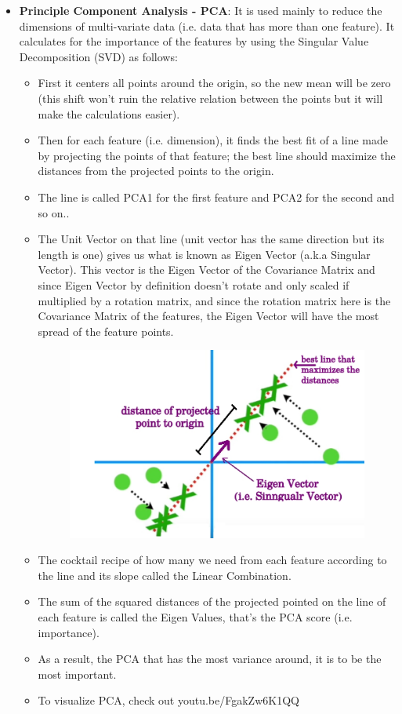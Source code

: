 \documentclass[11pt, twocolumn]{article}
\begin{document}
\begin{itemize}
\item \textbf{Principle Component Analysis - PCA}:
It is used mainly to reduce the dimensions of multi-variate data (i.e. data that has more than one feature). It calculates for the importance of the features by using the {\color{blue} Singular Value Decomposition (SVD)} as follows:
\begin{itemize}
\item First it {\color{blue} centers} all points around the origin, so the new mean will be zero (this shift won't ruin the relative relation between the points but it will make the calculations easier).
\item Then for each feature (i.e. dimension), it finds the {\color{blue} best fit} of a line made by {\color{blue} projecting} the points of that feature; the best line should {\color{blue} maximize the distances} from the projected points to the origin.
\item The line is called PCA1 for the first feature and PCA2 for the second and so on..
\item The {\color{blue} Unit Vector} on that line (unit vector has the same direction but its length is one) gives us what is known as {\color{blue} Eigen Vector} (a.k.a Singular Vector). This vector is the Eigen Vector of the {\color{blue} Covariance Matrix} and since Eigen Vector by definition doesn't rotate and only scaled if multiplied by a rotation matrix, and since the rotation matrix here is the Covariance Matrix of the features, the Eigen Vector will have the {\color{blue} most spread} of the feature points.
\begin{figure}[h!]
  \centering
  \includegraphics[width=0.75\linewidth]{figs/pca.jpeg}
\end{figure}
\item The cocktail recipe of how many we need from each feature according to the line and its slope called the {\color{blue} Linear Combination}.
\item The sum of the squared distances of the projected pointed on the line of each feature is called the {\color{blue} Eigen Values}, that's the {\color{blue} PCA score} (i.e. importance).
\item As a result, the PCA that has the {\color{blue} most variance} around, it is to be the {\color{blue} most important}.
\item To visualize PCA, check out {\color{blue} youtu.be/FgakZw6K1QQ}
\end{itemize}
\end{itemize}
\end{document}
